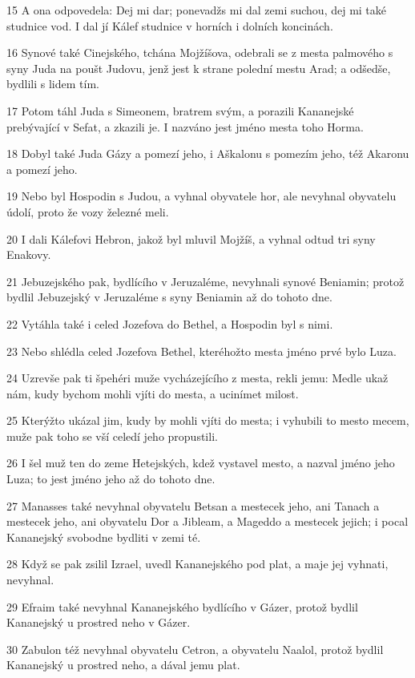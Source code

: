 \par 15 A ona odpovedela: Dej mi dar; ponevadžs mi dal zemi suchou, dej mi také studnice vod. I dal jí Kálef studnice v horních i dolních koncinách.
\par 16 Synové také Cinejského, tchána Mojžíšova, odebrali se z mesta palmového s syny Juda na poušt Judovu, jenž jest k strane polední mestu Arad; a odšedše, bydlili s lidem tím.
\par 17 Potom táhl Juda s Simeonem, bratrem svým, a porazili Kananejské prebývající v Sefat, a zkazili je. I nazváno jest jméno mesta toho Horma.
\par 18 Dobyl také Juda Gázy a pomezí jeho, i Aškalonu s pomezím jeho, též Akaronu a pomezí jeho.
\par 19 Nebo byl Hospodin s Judou, a vyhnal obyvatele hor, ale nevyhnal obyvatelu údolí, proto že vozy železné meli.
\par 20 I dali Kálefovi Hebron, jakož byl mluvil Mojžíš, a vyhnal odtud tri syny Enakovy.
\par 21 Jebuzejského pak, bydlícího v Jeruzaléme, nevyhnali synové Beniamin; protož bydlil Jebuzejský v Jeruzaléme s syny Beniamin až do tohoto dne.
\par 22 Vytáhla také i celed Jozefova do Bethel, a Hospodin byl s nimi.
\par 23 Nebo shlédla celed Jozefova Bethel, kteréhožto mesta jméno prvé bylo Luza.
\par 24 Uzrevše pak ti špehéri muže vycházejícího z mesta, rekli jemu: Medle ukaž nám, kudy bychom mohli vjíti do mesta, a ucinímet milost.
\par 25 Kterýžto ukázal jim, kudy by mohli vjíti do mesta; i vyhubili to mesto mecem, muže pak toho se vší celedí jeho propustili.
\par 26 I šel muž ten do zeme Hetejských, kdež vystavel mesto, a nazval jméno jeho Luza; to jest jméno jeho až do tohoto dne.
\par 27 Manasses také nevyhnal obyvatelu Betsan a mestecek jeho, ani Tanach a mestecek jeho, ani obyvatelu Dor a Jibleam, a Mageddo a mestecek jejich; i pocal Kananejský svobodne bydliti v zemi té.
\par 28 Když se pak zsilil Izrael, uvedl Kananejského pod plat, a maje jej vyhnati, nevyhnal.
\par 29 Efraim také nevyhnal Kananejského bydlícího v Gázer, protož bydlil Kananejský u prostred neho v Gázer.
\par 30 Zabulon též nevyhnal obyvatelu Cetron, a obyvatelu Naalol, protož bydlil Kananejský u prostred neho, a dával jemu plat.
